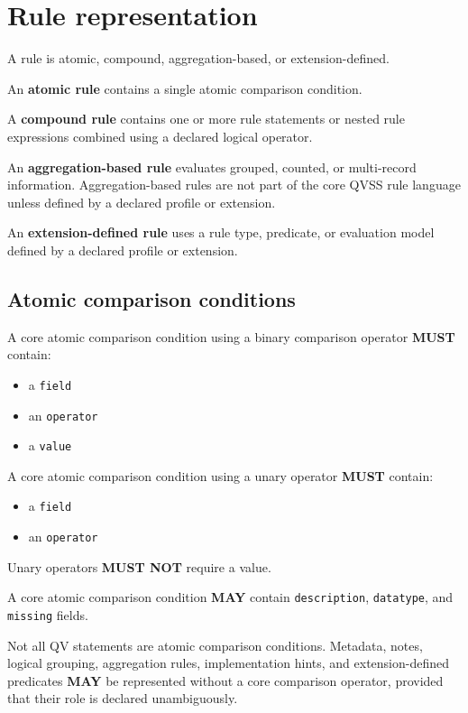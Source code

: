 \documentclass[11pt,a4paper]{article}
\begin{document}
\section{Rule representation}

A rule is atomic, compound, aggregation-based, or extension-defined.

An \textbf{atomic rule} contains a single atomic comparison condition.

A \textbf{compound rule} contains one or more rule statements or nested rule expressions combined using a declared logical operator.

An \textbf{aggregation-based rule} evaluates grouped, counted, or multi-record information. Aggregation-based rules are not part of the core QVSS rule language unless defined by a declared profile or extension.

An \textbf{extension-defined rule} uses a rule type, predicate, or evaluation model defined by a declared profile or extension.

\subsection{Atomic comparison conditions}

A core atomic comparison condition using a binary comparison operator \textbf{MUST} contain:

\begin{itemize}
\item a \texttt{field}
\item an \texttt{operator}
\item a \texttt{value}
\end{itemize}

A core atomic comparison condition using a unary operator \textbf{MUST} contain:

\begin{itemize}
\item a \texttt{field}
\item an \texttt{operator}
\end{itemize}

Unary operators \textbf{MUST NOT} require a value.

A core atomic comparison condition \textbf{MAY} contain \texttt{description}, \texttt{datatype}, and \texttt{missing} fields.

Not all QV statements are atomic comparison conditions. Metadata, notes, logical grouping, aggregation rules, implementation hints, and extension-defined predicates \textbf{MAY} be represented without a core comparison operator, provided that their role is declared unambiguously.
\end{document}
